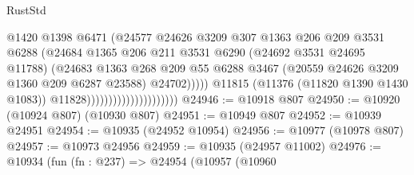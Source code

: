 \begin{lexlean}{RustStd}
\begin{coremodule}
{\begin{coremodule}
{{{{{{{{{{{{{{{{{{{{{{{{{{{{{{{{{{{{{{{{{{{{{{{{{{{{{{{{{{{{{{{{{{{{{{{{{{{{{{{{{{{{{                                                  @1420
                                                  @1398
                                                  @6471
                                                  (@24577
                                                    @24626
                                                    @3209
                                                    @307
                                                    @1363
                                                    @206
                                                    @209
                                                    @3531
                                                    @6288
                                                    (@24684
                                                      @1365
                                                      @206
                                                      @211
                                                      @3531
                                                      @6290
                                                      (@24692 @3531 @24695 @11788)
                                                      (@24683
                                                        @1363
                                                        @268
                                                        @209
                                                        @55
                                                        @6288
                                                        @3467
                                                        (@20559
                                                          @24626
                                                          @3209
                                                          @1360
                                                          @209
                                                          @6287
                                                          @23588)
                                                        @24702)))))
                                              @11815
                                              (@11376 (@11820 @1390 @1430 @1083))
                                              @11828)))))))))))))))))))))
@24946 := @10918 @807
@24950 := @10920 (@10924 @807) (@10930 @807)
@24951 := @10949 @807
@24952 := @10939 @24951
@24954 := @10935 (@24952 @10954)
@24956 := @10977 (@10978 @807)
@24957 := @10973 @24956
@24959 := @10935 (@24957 @11002)
@24976 := @10934
    (fun (fn : @237) =>
    @24954
      (@10957
        (@10960
}}}}}}}}}}}}}}}}}}}}}}}}}}}}}}}}}}}}}}}}}}}}}}}}}}}}}}}}}}}}}}}}}}}}}}}}}}}}}}}}}}}}}
\end{coremodule}}
\end{coremodule}
\end{lexlean}
